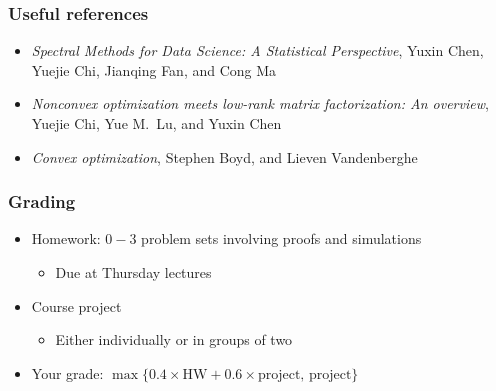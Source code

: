 \documentclass[compress,
mathserif,wide,%
]{beamer}
\begin{document}
\begin{frame}
  \frametitle{Useful references}

\begin{itemize}
  \item {\textit{Spectral Methods for Data Science: A Statistical Perspective}},  Yuxin Chen, Yuejie Chi, Jianqing Fan, and Cong Ma 
\item {\textit{Nonconvex optimization meets low-rank matrix factorization: An overview}},  Yuejie Chi, Yue M.~Lu, and Yuxin Chen 
\item {\textit{Convex optimization}}, Stephen Boyd, and Lieven Vandenberghe

\end{itemize} 
\end{frame}





\begin{frame}
\frametitle{Grading}


\begin{itemize}
\itemsep3em

\item Homework: $0-3$ problem sets involving proofs and simulations
\smallskip
\begin{itemize}
  \itemsep0.3em
  \item Due at Thursday lectures
\end{itemize}



\item Course project 
\begin{itemize}
  \item Either individually or in groups of two
\end{itemize}


\item Your grade: $\max\{ 0.4\times \text{HW} + 0.6\times \text{project},\, \text{project} \}$ 

\end{itemize}


\end{frame}
\end{document}
